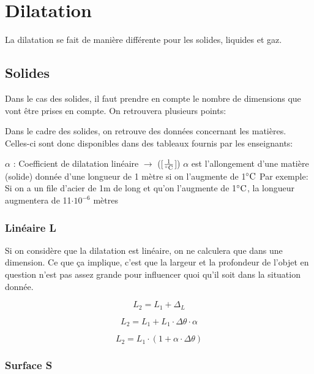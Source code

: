 \documentclass{article}
\begin{document}
\pagebreak
\section{Dilatation}

La dilatation se fait de manière différente pour les solides, liquides et gaz.

\subsection{Solides}

Dans le cas des solides, il faut prendre en compte le nombre de dimensions que vont être prises en compte. On retrouvera plusieurs points:

Dans le cadre des solides, on retrouve des données concernant les matières. Celles-ci sont donc disponibles dans des tableaux fournis par les enseignants:

$\alpha$ : Coefficient de dilatation linéaire $\rightarrow$ ([$\frac{1}{\celsius}$])
\newline $\alpha$ est l'allongement d'une matière (solide) donnée d'une longueur de 1 mètre si on l'augmente de 1$\celsius$
\newline Par exemple: Si on a un file d'acier de 1m de long et qu'on l'augmente de 1$\celsius$, la longueur augmentera de 11$\cdot$$10^{-6}$ mètres 
  
\subsubsection{Linéaire L}

Si on considère que la dilatation est linéaire, on ne calculera que dans une
dimension. Ce que ça implique, c'est que la largeur et la profondeur de l'objet
en question n'est pas assez grande pour influencer quoi qu'il soit dans 
la situation donnée.

\begin{equation}
  L_2 = L_1 + \Delta_L
\end{equation}

\begin{equation}
  L_2 = L_1 + L_1 \cdot \Delta\theta \cdot \alpha
\end{equation}

\begin{equation}
  L_2 = L_1 \cdot (1 + \alpha \cdot \Delta\theta)
\end{equation}

\subsubsection{Surface S}
\end{document}
